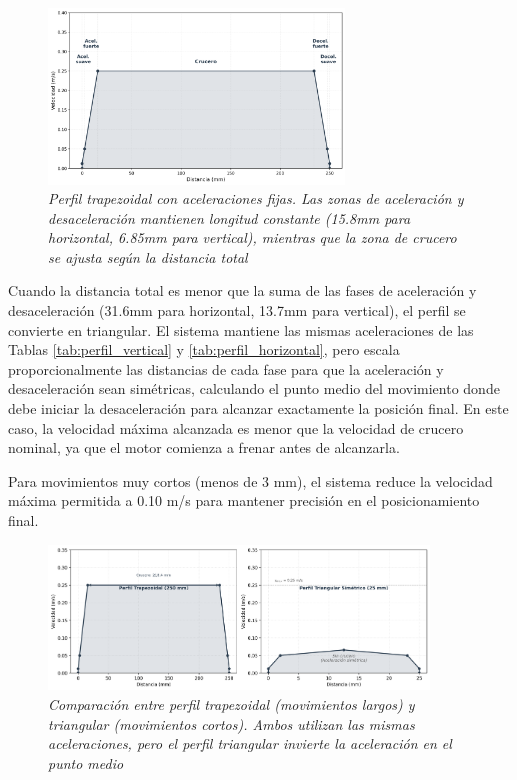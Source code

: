 \begin{figure}[H]
    \centering
    \includegraphics[width=0.7\textwidth]{imagenes/perfil_trapezoidal_velocidad.png}
    \caption{\textit{Perfil trapezoidal con aceleraciones fijas. Las zonas de aceleración y desaceleración mantienen longitud constante (15.8mm para horizontal, 6.85mm para vertical), mientras que la zona de crucero se ajusta según la distancia total}}
    \label{fig:perfil_trapezoidal}
\end{figure}

Cuando la distancia total es menor que la suma de las fases de aceleración y desaceleración (31.6mm para horizontal, 13.7mm para vertical), el perfil se convierte en triangular. El sistema mantiene las mismas aceleraciones de las Tablas \ref{tab:perfil_vertical} y \ref{tab:perfil_horizontal}, pero escala proporcionalmente las distancias de cada fase para que la aceleración y desaceleración sean simétricas, calculando el punto medio del movimiento donde debe iniciar la desaceleración para alcanzar exactamente la posición final. En este caso, la velocidad máxima alcanzada es menor que la velocidad de crucero nominal, ya que el motor comienza a frenar antes de alcanzarla. 

Para movimientos muy cortos (menos de 3 mm), el sistema reduce la velocidad máxima permitida a 0.10 m/s para mantener precisión en el posicionamiento final.

\begin{figure}[H]
    \centering
    \includegraphics[width=0.9\textwidth]{imagenes/perfil_trapezoidal_triangular.png}
    \caption{\textit{Comparación entre perfil trapezoidal (movimientos largos) y triangular (movimientos cortos). Ambos utilizan las mismas aceleraciones, pero el perfil triangular invierte la aceleración en el punto medio}}
    \label{fig:perfil_comparacion}
\end{figure}

